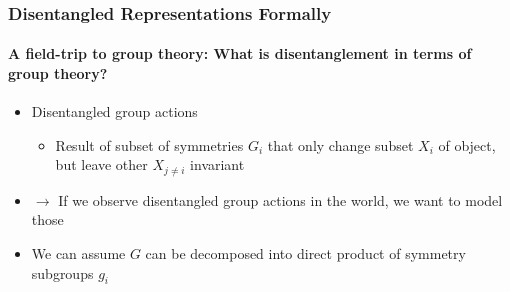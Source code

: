 \documentclass[9pt]{beamer}
\begin{document}
\begin{frame}
\frametitle{Disentangled Representations Formally}
\framesubtitle{A field-trip to group theory: What is disentanglement in terms of group theory?}
\begin{itemize}%
	\item Disentangled group actions
	\begin{itemize}
		\item Result of subset of symmetries $G_i$ that only change subset $X_i$ of object, but leave other $X_{j \neq i}$ invariant
	\end{itemize}
	\item $\rightarrow$ If we observe disentangled group actions in the world, we want to model those
	\item We can assume $G$ can be decomposed into direct product of symmetry subgroups $g_i$
\end{itemize}
\end{frame} 
\end{document}
